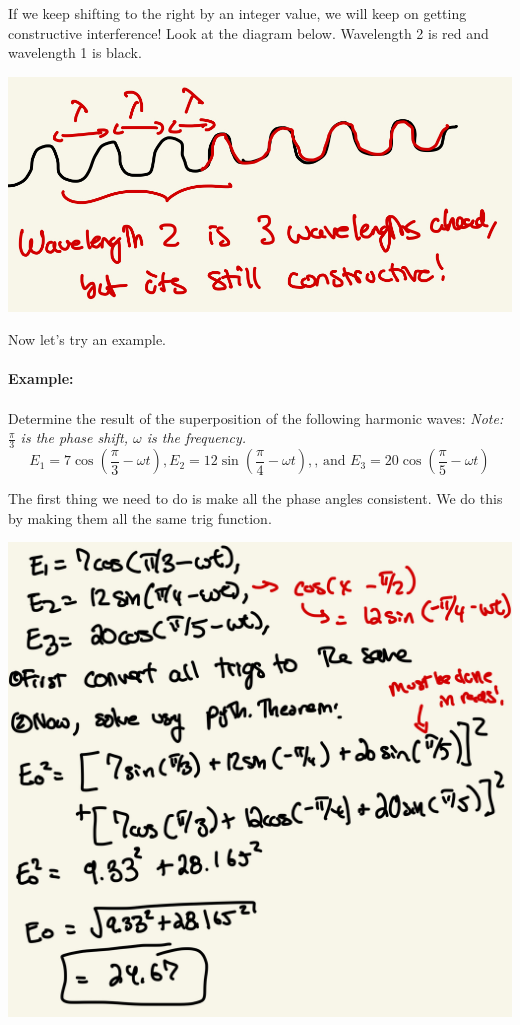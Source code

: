 \documentclass[10pt]{article}
\begin{document}
\newpage

If we keep shifting to the right by an integer value, we will keep on getting constructive interference! Look at the diagram below. Wavelength 2 is red and wavelength 1 is black.

\begin{center}
    \includegraphics*[scale = .35]{imgs/interger-difference.jpeg}
\end{center}

Now let's try an example.\\ \\
\textbf{Example:} \\ \\ 
Determine the result of the superposition of the following harmonic waves:
\textit{Note: $\frac{\pi}{3}$ is the phase shift, $\omega$ is the frequency.}
\[E_1 = 7 \cos(\frac{\pi}{3} - \omega t), E_2 = 12 \sin(\frac{\pi}{4} - \omega t), \text{, and } E_3 = 20 \cos(\frac{\pi}{5} - \omega t)\]

The first thing we need to do is make all the phase angles consistent. We do this by making them all the same trig function.

\begin{center}
    \includegraphics*[scale = .2]{imgs/superposition-example.jpeg}
\end{center}
\end{document}
